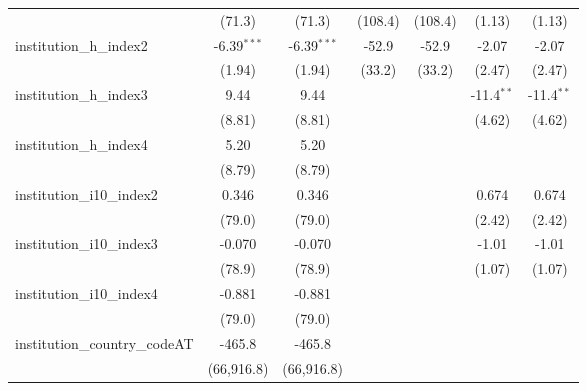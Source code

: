 \begin{tabular}{lcccccc}
                                         & (71.3)        & (71.3)        & (108.4)       & (108.4)       & (1.13)        & (1.13)\\   
   institution\_h\_index2                & -6.39$^{***}$ & -6.39$^{***}$ & -52.9         & -52.9         & -2.07         & -2.07\\   
                                         & (1.94)        & (1.94)        & (33.2)        & (33.2)        & (2.47)        & (2.47)\\   
   institution\_h\_index3                & 9.44          & 9.44          &               &               & -11.4$^{**}$  & -11.4$^{**}$\\   
                                         & (8.81)        & (8.81)        &               &               & (4.62)        & (4.62)\\   
   institution\_h\_index4                & 5.20          & 5.20          &               &               &               &   \\   
                                         & (8.79)        & (8.79)        &               &               &               &   \\   
   institution\_i10\_index2              & 0.346         & 0.346         &               &               & 0.674         & 0.674\\   
                                         & (79.0)        & (79.0)        &               &               & (2.42)        & (2.42)\\   
   institution\_i10\_index3              & -0.070        & -0.070        &               &               & -1.01         & -1.01\\   
                                         & (78.9)        & (78.9)        &               &               & (1.07)        & (1.07)\\   
   institution\_i10\_index4              & -0.881        & -0.881        &               &               &               &   \\   
                                         & (79.0)        & (79.0)        &               &               &               &   \\   
   institution\_country\_codeAT          & -465.8        & -465.8        &               &               &               &   \\   
                                         & (66,916.8)    & (66,916.8)    &               &               &               &   \\   

\end{tabular}
